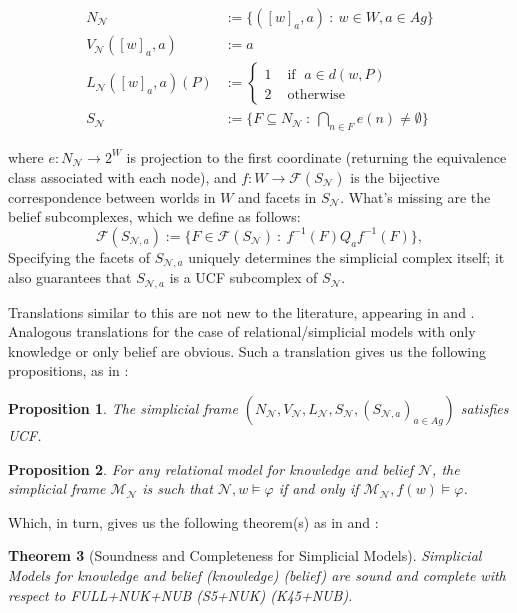 \documentclass[11pt]{article}
\newtheorem{theorem}{Theorem}[section]
\newtheorem{proposition}[theorem]{Proposition}
\theoremstyle{definition}
\newcommand{\M}{\mathcal{M}}
\newcommand{\F}{\mathcal{F}}
\renewcommand{\M}{\mathcal{M}}
\newcommand{\N}{\mathcal{N}}
\newcommand{\full}{\textsf{FULL}}
\begin{document}
\begin{align*}
		N_{\N} &:= \{([w]_{a},a) \: : \: w \in W, a \in Ag\}\\
V_{\N}([w]_{a},a) &:= a\\
L_{\N}([w]_{a},a)(P) &:=\begin{cases}
	1& \text{ if }\;a\in d(w,P)\\
	2& \text{ otherwise}
\end{cases}\\
S_{\N} &:= \{F \subseteq N_{\N} \: : \: \bigcap_{n \in F} e(n) \neq \emptyset\}
\end{align*}

	where $e: N_{\N} \to 2^{W}$ is projection to the first coordinate (returning the equivalence class associated with each node), and $f \colon W \to \F(S_{\N})$ is the bijective correspondence between worlds in $W$ and facets in $S_{\N}$. What's missing are the belief subcomplexes, which we define as follows:
	$$\mathcal{F}(S_{\N,a}) := \{F\in\mathcal{F}(S_{\N}) \: : \: f^{-1}(F) Q_{a} f^{-1}(F)\},$$
	Specifying the facets of $S_{\N,a}$ uniquely determines the simplicial complex itself; it also guarantees that $S_{\N,a}$ is a UCF subcomplex of $S_{\N}$. 
	
	Translations similar to this are not new to the literature, appearing in \cite{SimpDEL} and \cite{KaSC}. Analogous translations for the case of relational/simplicial models with only knowledge or only belief are obvious. Such a translation gives us the following propositions, as in \cite{BelSimp}:
	
	\begin{proposition}
		The simplicial frame $(N_{\N},V_{\N},L_{\N},S_{\N},(S_{\N,a})_{a\in Ag})$ satisfies UCF.
	\end{proposition}

	\begin{proposition}
		For any relational model for knowledge and belief $\N$, the simplicial frame $\M_{\N}$ is such that $\N,w\vDash\varphi$ if and only if $\M_\N,f(w)\vDash\varphi$.
	\end{proposition}

	Which, in turn, gives us the following theorem(s) as in \cite{BelSimp} and \cite{SimpBelRev}:
	
	\begin{theorem}[Soundness and Completeness for Simplicial Models]
		Simplicial Models for knowledge and belief (knowledge) (belief) are sound and complete with respect to \full+\textsf{NUK}+\textsf{NUB} (\textsf{S5}+\textsf{NUK}) (\textsf{K45}+\textsf{NUB}).
	\end{theorem}
	
\end{document}
